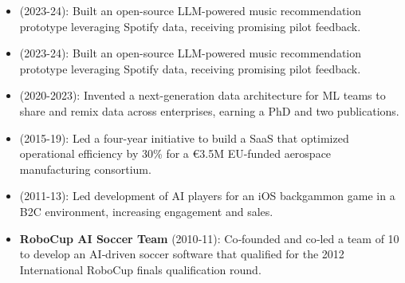 \begin{itemize}

\item {} (2023-24): Built an open-source LLM-powered music recommendation prototype leveraging Spotify data, receiving promising pilot feedback.

\item {} (2023-24): Built an open-source LLM-powered music recommendation prototype leveraging Spotify data, receiving promising pilot feedback.

\item {} (2020-2023): Invented a next-generation data architecture for ML teams to share and remix data across enterprises, earning a PhD and two publications.

\item {} (2015-19): Led a four-year initiative to build a SaaS that optimized operational efficiency by 30\% for a €3.5M EU-funded aerospace manufacturing consortium.

\item {} (2011-13): Led development of AI players for an iOS backgammon game in a B2C environment, increasing engagement and sales.

\item \textbf{RoboCup AI Soccer Team} (2010‑11): Co‑founded and co‑led a team of 10 to develop an AI‑driven soccer software that qualified for the 2012 International RoboCup finals qualification round.




\end{itemize}
